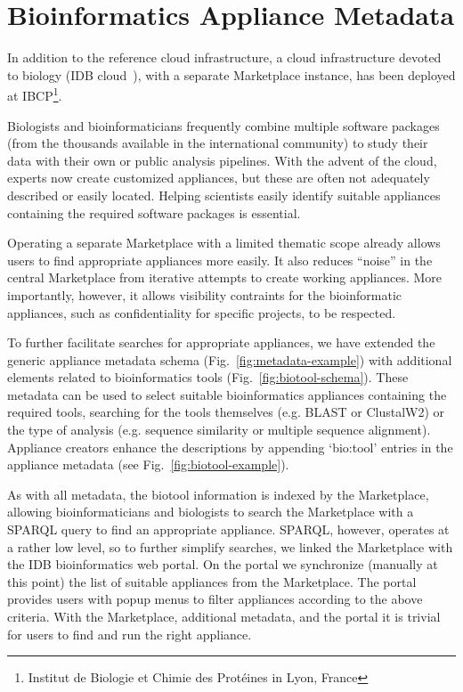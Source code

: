 \section{Bioinformatics Appliance Metadata}
\label{sec:bioinfo}

In addition to the reference cloud infrastructure, a cloud
infrastructure devoted to biology (IDB cloud~\cite{idbcloud}), with a
separate Marketplace instance, has been deployed at
IBCP\footnote{Institut de Biologie et Chimie des Prot\'eines in Lyon,
  France}.

Biologists and bioinformaticians frequently combine multiple software
packages (from the thousands available in the international community)
to study their data with their own or public analysis pipelines. With
the advent of the cloud, experts now create customized appliances, but
these are often not adequately described or easily located.  Helping
scientists easily identify suitable appliances containing the required
software packages is essential.

Operating a separate Marketplace with a limited thematic scope already
allows users to find appropriate appliances more easily.  It also
reduces ``noise'' in the central Marketplace from iterative attempts
to create working appliances.  More importantly, however, it allows
visibility contraints for the bioinformatic appliances, such as
confidentiality for specific projects, to be respected.

To further facilitate searches for appropriate appliances, we have
extended the generic appliance metadata schema
(Fig.~\ref{fig:metadata-example}) with additional elements related to
bioinformatics tools (Fig.~\ref{fig:biotool-schema})\@. These metadata
can be used to select suitable bioinformatics appliances containing
the required tools, searching for the tools themselves (e.g. BLAST or
ClustalW2) or the type of analysis (e.g. sequence similarity or
multiple sequence alignment).  Appliance creators enhance the
descriptions by appending `bio:tool' entries in the appliance metadata
(see Fig.~\ref{fig:biotool-example}).

As with all metadata, the biotool information is indexed by the
Marketplace, allowing bioinformaticians and biologists to search the
Marketplace with a SPARQL query to find an appropriate appliance.
SPARQL, however, operates at a rather low level, so to further
simplify searches, we linked the Marketplace with the IDB
bioinformatics web portal. On the portal we synchronize (manually at
this point) the list of suitable appliances from the Marketplace. The
portal provides users with popup menus to filter appliances according
to the above criteria.  With the Marketplace, additional metadata, and
the portal it is trivial for users to find and run the right
appliance.

